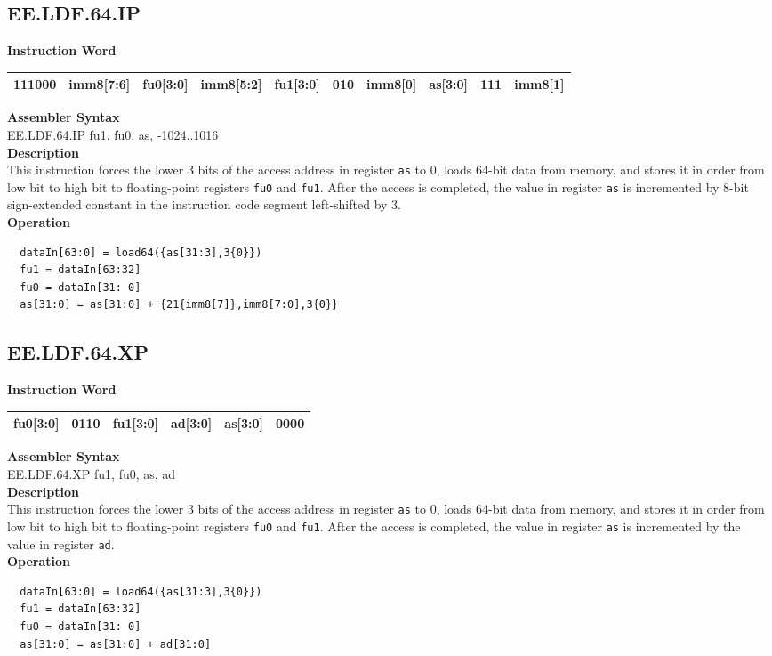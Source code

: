 \clearpage
\subsection{EE.LDF.64.IP}\label{instruction:EELDF64IP}
\setlength\tabcolsep{6pt}
\textbf{Instruction Word} \\
\begin{tabular}{|c|c|c|c|c|c|c|c|c|c|}
	\hline
	111000 & imm8[7:6] & fu0[3:0] & imm8[5:2] & fu1[3:0] & 010 & imm8[0] & as[3:0] & 111 & imm8[1] \\
	\hline
\end{tabular}

\textbf{Assembler Syntax} \\
EE.LDF.64.IP fu1, fu0, as, -1024..1016 \\
\textbf{Description} \\
This instruction forces the lower 3 bits of the access address in register \lstinline{as} to 0, loads 64-bit data from memory, and stores it in order from low bit to high bit to floating-point registers \lstinline{fu0} and \lstinline{fu1}. After the access is completed, the value in register \lstinline{as} is incremented by 8-bit sign-extended constant in the instruction code segment left-shifted by 3.\\
\textbf{Operation}
\begin{lstlisting}
  dataIn[63:0] = load64({as[31:3],3{0}})
  fu1 = dataIn[63:32]
  fu0 = dataIn[31: 0]
  as[31:0] = as[31:0] + {21{imm8[7]},imm8[7:0],3{0}}
\end{lstlisting}

\clearpage
\subsection{EE.LDF.64.XP}\label{instruction:EELDF64XP}
\setlength\tabcolsep{6pt}
\textbf{Instruction Word} \\
\begin{tabular}{|c|c|c|c|c|c|}
	\hline
	fu0[3:0] & 0110 & fu1[3:0] & ad[3:0] & as[3:0] & 0000 \\
	\hline
\end{tabular}

\textbf{Assembler Syntax} \\
EE.LDF.64.XP fu1, fu0, as, ad \\
\textbf{Description} \\
This instruction forces the lower 3 bits of the access address in register \lstinline{as} to 0, loads 64-bit data from memory, and stores it in order from low bit to high bit to floating-point registers \lstinline{fu0} and \lstinline{fu1}. After the access is completed, the value in register \lstinline{as} is incremented by the value in register \lstinline{ad}.\\
\textbf{Operation}
\begin{lstlisting}
  dataIn[63:0] = load64({as[31:3],3{0}})
  fu1 = dataIn[63:32]
  fu0 = dataIn[31: 0]
  as[31:0] = as[31:0] + ad[31:0]
\end{lstlisting}

